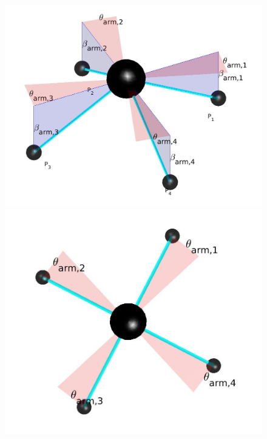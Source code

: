 \begin{figure}[h]
\centering
\begin{minipage}[t]{0.3\textwidth}
  \centering
  \includegraphics[width=\textwidth]{images/drone_design.jpg}
\end{minipage}
\hfill
\begin{minipage}[t]{0.3\textwidth}
  \centering
  \includegraphics[width=\textwidth]{images/drone_design1.jpg}
\end{minipage}
\hfill
\begin{minipage}[t]{0.3\textwidth}

\end{minipage}
\end{figure}

